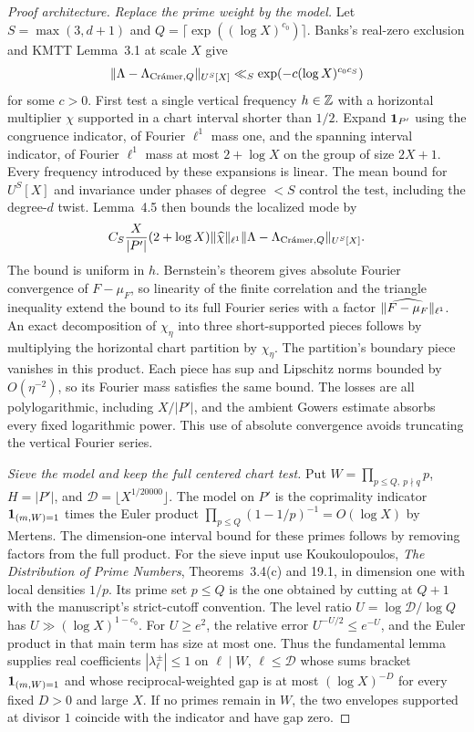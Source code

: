 \begin{proof}[Proof architecture]
\emph{Replace the prime weight by the model.}
Let $S=\max(3,d+1)$ and
$Q=\lceil\exp((\log X)^{c_0})\rceil$.
Banks's real-zero exclusion and KMTT Lemma~3.1 at scale $X$ give
\[
 \lVert\Lambda-\Lambda_{\textup{Cr\'amer},Q}\rVert_{U^S[X]}
 \ll_S \exp(-c(\log X)^{c_0c_S})
\]
for some $c>0$. First test a single vertical frequency $h\in\mathbb Z$ with a
horizontal multiplier $\chi$ supported in a chart interval shorter
than $1/2$. Expand $\mathbf 1_{P'}$ using the congruence indicator, of
Fourier $\ell^1$ mass one, and the spanning interval indicator, of
Fourier $\ell^1$ mass at most $2+\log X$ on the group of size
$2X+1$. Every frequency introduced by these expansions is linear.
The mean bound for $U^S[X]$ and invariance under phases of degree
$<S$ control the test, including the degree-$d$ twist. Lemma~4.5
then bounds the localized mode by
\[
 C_S\frac{X}{|P'|}(2+\log X)
       \lVert\widehat\chi\rVert_{\ell^1}
       \lVert\Lambda-\Lambda_{\textup{Cr\'amer},Q}\rVert_{U^S[X]} .
\]
The bound is uniform in $h$. Bernstein's theorem gives absolute
Fourier convergence of $F-\mu_F$, so linearity of the finite
correlation and the triangle inequality extend the bound to its
full Fourier series with a factor $\lVert\widehat{F-\mu_F}\rVert_{\ell^1}$.
An exact decomposition of $\chi_\eta$ into three short-supported
pieces follows by multiplying the horizontal chart partition by
$\chi_\eta$. The partition's boundary piece vanishes in this
product. Each piece has sup and Lipschitz norms bounded by
$O(\eta^{-2})$, so its Fourier mass satisfies the same bound.
The losses are all polylogarithmic, including $X/|P'|$, and the
ambient Gowers estimate absorbs every fixed logarithmic power.
This use of absolute convergence avoids truncating the vertical
Fourier series.

\emph{Sieve the model and keep the full centered chart test.}
Put $W=\prod_{p\le Q,\ p\nmid q}p$, $H=|P'|$, and
$\mathcal D=\lfloor X^{1/20000}\rfloor$. The model on $P'$ is
the coprimality indicator $\mathbf 1_{(m,W)=1}$ times the Euler product
$\prod_{p\le Q}(1-1/p)^{-1}=O(\log X)$ by Mertens. The
dimension-one interval bound for these primes follows by removing
factors from the full product. For the sieve input use
Koukoulopoulos, \emph{The Distribution of Prime Numbers},
Theorems~3.4(c) and 19.1, in dimension one with local
densities $1/p$. Its prime set $p\le Q$ is the one obtained
by cutting at $Q+1$ with the manuscript's strict-cutoff convention.
The level ratio $U=\log\mathcal D/\log Q$ has
$U\gg(\log X)^{1-c_0}$. For $U\ge e^2$, the relative error
$U^{-U/2}\le e^{-U}$, and the Euler product in that main term has
size at most one. Thus the fundamental lemma supplies real
coefficients $|\lambda_\ell^\pm|\le1$ on
$\ell\mid W$, $\ell\le\mathcal D$ whose sums bracket
$\mathbf 1_{(m,W)=1}$ and whose reciprocal-weighted gap is at most
$(\log X)^{-D}$ for every fixed $D>0$ and large $X$.
If no primes remain in $W$, the two envelopes supported at
divisor $1$ coincide with the indicator and have gap zero.


\end{proof}
